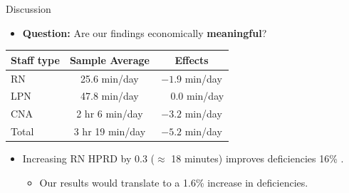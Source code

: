 \documentclass{beamer}
\begin{document}
\begin{frame}[t]{Discussion}
\small

\begin{itemize}
	\item \textbf{Question:} Are our findings economically \textbf{meaningful}?
\end{itemize}

\vfill
\centering
\renewcommand{\arraystretch}{1.25}
\setlength{\tabcolsep}{12pt}

\begin{tabular}{lcc}
\toprule
\textbf{Staff type} & \textbf{Sample Average} & \textbf{Effects} \\
\midrule
RN    & 25.6 min/day    & $-1.9$ min/day \\
LPN   & 47.8 min/day    & $\;\;\;\;0.0$ min/day \\
CNA   & 2 hr 6 min/day  & $-3.2$ min/day \\
Total & 3 hr 19 min/day & $-5.2$ min/day \\
\bottomrule
\end{tabular}
\vfill

\begin{itemize}
	\item Increasing RN HPRD by 0.3 ($\approx$ 18 minutes) improves deficiencies 16\% \cite{lin_2014}.
	\begin{itemize}
		\item Our results would translate to a 1.6\% increase in deficiencies.
	\end{itemize}

\end{itemize}

\end{frame}
\end{document}
